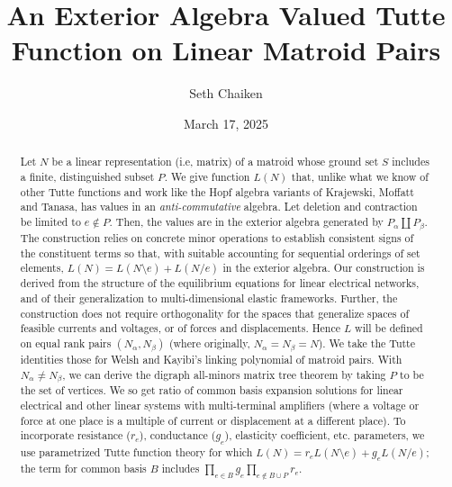 \documentclass{article}
\title{An Exterior Algebra Valued Tutte Function on Linear Matroid Pairs}
\date{March 17, 2025}
\author{Seth Chaiken}
\begin{document}
\maketitle

\begin{abstract}
Let $N$ be a linear representation (i.e, matrix) of a matroid whose
ground set $S$ includes a finite, distinguished subset $P$.  We give
function $L(N)$ that, unlike what we know of other Tutte functions and
work like the Hopf algebra variants of Krajewski, Moffatt and Tanasa,
has values in an \emph{anti-commutative} algebra. Let deletion and
contraction be limited to $e\not\in P$.  Then, the values are in the
exterior algebra generated by $P_\alpha \coprod P_\beta$.  The
construction relies on concrete minor operations to establish
consistent signs of the constituent terms so that, with suitable
accounting for sequential orderings of set elements,
$L(N)=L(N\setminus e)+L(N/e)$ in the exterior algebra. Our
construction is derived from the structure of the equilibrium
equations for linear electrical networks, and of their generalization
to multi-dimensional elastic frameworks.  Further, the construction
does not require orthogonality for the spaces that generalize spaces
of feasible currents and voltages, or of forces and displacements.
Hence $L$ will be defined on equal rank pairs $(N_\alpha, N_\beta)$
(where originally, $N_\alpha=N_\beta=N$).  We take the Tutte
identities those for Welsh and Kayibi's linking polynomial of matroid
pairs. With $N_\alpha\neq N_\beta$, we can derive the digraph
all-minors matrix tree theorem by taking $P$ to be the set of
vertices.  We so get ratio of common basis expansion solutions for
linear electrical and other linear systems with multi-terminal
amplifiers (where a voltage or force at one place is a multiple of
current or displacement at a different place).  To incorporate
resistance ($r_e$), conductance ($g_e$), elasticity coefficient,
etc. parameters, we use parametrized Tutte function theory for which
$L(N)=r_e L(N\setminus e)+ g_e L(N/e)$; the term for common basis $B$
includes $\prod _{e\in B} g_e \prod _{e\not\in B\cup P} r_e$.
\end{abstract}
\end{document}

